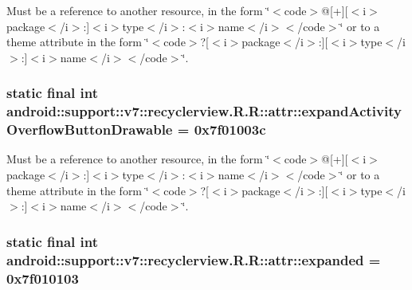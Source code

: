 Must be a reference to another resource, in the form \char`\"{}$<$code$>$@\mbox{[}+\mbox{]}\mbox{[}$<$i$>$package$<$/i$>$:\mbox{]}$<$i$>$type$<$/i$>$:$<$i$>$name$<$/i$>$$<$/code$>$\char`\"{} or to a theme attribute in the form \char`\"{}$<$code$>$?\mbox{[}$<$i$>$package$<$/i$>$:\mbox{]}\mbox{[}$<$i$>$type$<$/i$>$:\mbox{]}$<$i$>$name$<$/i$>$$<$/code$>$\char`\"{}. \hypertarget{classandroid_1_1support_1_1v7_1_1recyclerview_1_1_r_1_1attr_19eecefa0b7171b53a2e8c7805a7a2a9}{
\subsubsection[{expandActivityOverflowButtonDrawable}]{\setlength{\rightskip}{0pt plus 5cm}static final int android::support::v7::recyclerview.R.R::attr::expandActivityOverflowButtonDrawable = 0x7f01003c}}
\label{classandroid_1_1support_1_1v7_1_1recyclerview_1_1_r_1_1attr_19eecefa0b7171b53a2e8c7805a7a2a9}


Must be a reference to another resource, in the form \char`\"{}$<$code$>$@\mbox{[}+\mbox{]}\mbox{[}$<$i$>$package$<$/i$>$:\mbox{]}$<$i$>$type$<$/i$>$:$<$i$>$name$<$/i$>$$<$/code$>$\char`\"{} or to a theme attribute in the form \char`\"{}$<$code$>$?\mbox{[}$<$i$>$package$<$/i$>$:\mbox{]}\mbox{[}$<$i$>$type$<$/i$>$:\mbox{]}$<$i$>$name$<$/i$>$$<$/code$>$\char`\"{}. \hypertarget{classandroid_1_1support_1_1v7_1_1recyclerview_1_1_r_1_1attr_783284841cc247a1593b5a896080fa82}{
\subsubsection[{expanded}]{\setlength{\rightskip}{0pt plus 5cm}static final int android::support::v7::recyclerview.R.R::attr::expanded = 0x7f010103}}
\label{classandroid_1_1support_1_1v7_1_1recyclerview_1_1_r_1_1attr_783284841cc247a1593b5a896080fa82}


